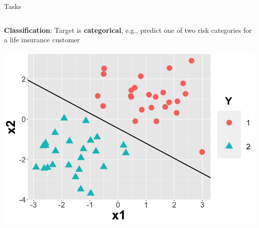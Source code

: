 \documentclass[11pt,compress,t,notes=noshow, xcolor=table]{beamer}
\begin{document}
\begin{vbframe}{Tasks}
\begin{columns}
\begin{column}{0.4\textwidth} 
\small \textbf{Classification}: Target is \textbf{categorical}, e.g., predict one of two risk categories for a life insurance customer
  
  \begin{center}
    \includegraphics[width=\textwidth]{slides/ml-basics/figure/nutshell-ml-basics-supervised-classification-task.png} 
  \end{center}
\end{column}    
\end{columns}    

\end{vbframe}
\end{document}
